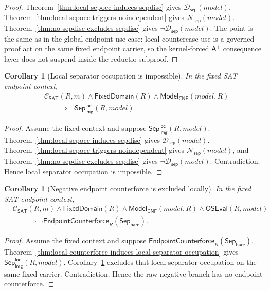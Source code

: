 \documentclass[11pt]{article}
\newtheorem{corollary}[theorem]{Corollary}
\theoremstyle{definition}
\theoremstyle{remark}
\newcommand{\SepBare}{\mathsf{Sep}_{\mathsf{bare}}}
\newcommand{\LocalSepImgOcc}{\mathsf{Sep}_{\mathsf{img}}^{\mathsf{loc}}}
\newcommand{\Aplus}{\mathsf{A}^{+}}
\newcommand{\ClayCtx}{\mathcal{C}_{\mathsf{SAT}}(R,m)}
\newcommand{\FixedDom}{\mathsf{FixedDomain}}
\newcommand{\SepDisc}{\mathcal{D}_{\mathsf{sep}}}
\newcommand{\NoSepDisc}{\mathcal{N}_{\mathsf{sep}}}
\newcommand{\ModelOfCnf}{\mathsf{Model}_{\mathsf{CNF}}}
\newcommand{\OfficialSATEval}{\mathsf{OSEval}}
\newcommand{\EndpointCounterforce}{\mathsf{EndpointCounterforce}}
\begin{document}
\begin{proof}
Theorem~\ref{thm:local-sepocc-induces-sepdisc} gives \(\SepDisc(model)\). Theorem~\ref{thm:local-sepocc-triggers-noindependent} gives \(\NoSepDisc(model)\). Theorem~\ref{thm:no-sepdisc-excludes-sepdisc} gives \(\neg\SepDisc(model)\). The point is the same as in the global endpoint-use case: local countercase use is a governed proof act on the same fixed endpoint carrier, so the kernel-forced \(\Aplus\) consequence layer does not suspend inside the reductio subproof.
\end{proof}

\begin{corollary}[Local separator occupation is impossible]
\label{cor:local-sepocc-impossible}
In the fixed SAT endpoint context,
\[
\begin{aligned}
  &\ClayCtx\wedge\FixedDom(R)\wedge\ModelOfCnf(model,R)\\
  &\qquad\Rightarrow \neg\LocalSepImgOcc(R,model).
\end{aligned}
\]
\end{corollary}

\begin{proof}
Assume the fixed context and suppose \(\LocalSepImgOcc(R,model)\). Theorem~\ref{thm:local-sepocc-induces-sepdisc} gives \(\SepDisc(model)\). Theorem~\ref{thm:local-sepocc-triggers-noindependent} gives \(\NoSepDisc(model)\), and Theorem~\ref{thm:no-sepdisc-excludes-sepdisc} gives \(\neg\SepDisc(model)\). Contradiction. Hence local separator occupation is impossible.
\end{proof}

\begin{corollary}[Negative endpoint counterforce is excluded locally]
\label{cor:negative-endpoint-counterforce-excluded}
In the fixed SAT endpoint context,
\[
\begin{aligned}
  &\ClayCtx\wedge\FixedDom(R)\wedge\ModelOfCnf(model,R)\wedge\OfficialSATEval(R,model)\\
  &\qquad\Rightarrow \neg\EndpointCounterforce_R(\SepBare).
\end{aligned}
\]
\end{corollary}

\begin{proof}
Assume the fixed context and suppose \(\EndpointCounterforce_R(\SepBare)\). Theorem~\ref{thm:local-counterforce-induces-local-separator-occupation} gives \(\LocalSepImgOcc(R,model)\). Corollary~\ref{cor:local-sepocc-impossible} excludes that local separator occupation on the same fixed carrier. Contradiction. Hence the raw negative branch has no endpoint counterforce.
\end{proof}
\end{document}
